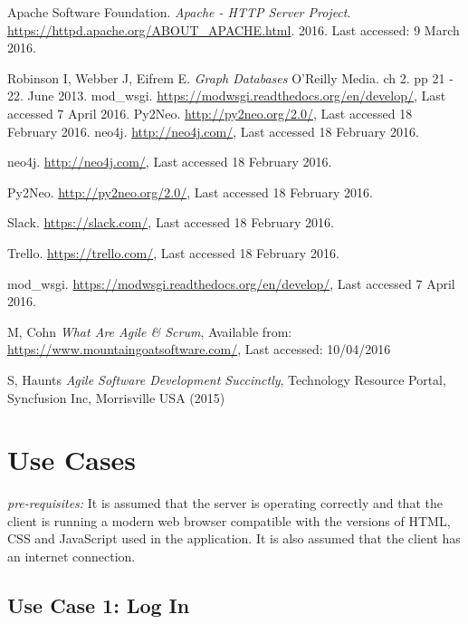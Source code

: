 \documentclass[12pt,onecolumn]{article}
\begin{document}
\begin{thebibliography}{1}
		 Apache Software Foundation. \emph{Apache - HTTP Server Project}. \url{https://httpd.apache.org/ABOUT_APACHE.html}. 2016. Last accessed: 9 March 2016.	
		
		 Robinson I, Webber J, Eifrem E. \emph{Graph Databases} O'Reilly Media. ch 2. pp 21 - 22. June 2013.
		 mod\_wsgi. \url{https://modwsgi.readthedocs.org/en/develop/}, Last accessed 7 April 2016.
		 Py2Neo. \url{http://py2neo.org/2.0/}, Last accessed 18 February 2016.
		 neo4j. \url{http://neo4j.com/}, Last accessed 18 February 2016.
		
		 neo4j. \url{http://neo4j.com/}, Last accessed 18 February 2016.
		
		 Py2Neo. \url{http://py2neo.org/2.0/}, Last accessed 18 February 2016.
		
		 Slack. \url{https://slack.com/}, Last accessed 18 February 2016.
		
		 Trello. \url{https://trello.com/}, Last accessed 18 February 2016.
		
		 mod\_wsgi. \url{https://modwsgi.readthedocs.org/en/develop/}, Last accessed 7 April 2016.
		
		
		 M, Cohn \emph{What Are Agile \& Scrum}, Available from: \url{https://www.mountaingoatsoftware.com/}, Last accessed: 10/04/2016
		
		 S, Haunts \emph{Agile Software Development Succinctly}, Technology Resource Portal, Syncfusion Inc, Morrisville USA (2015)
		
		
	\end{thebibliography}
	
	\newpage
	
	\appendix
	
	\section{Use Cases} \label{moreusecase}
	
	\emph{pre-requisites:} It is assumed that the server is operating correctly and that the client is running a modern web browser compatible with the versions of HTML, CSS and JavaScript used in the application. It is also assumed that the client has an internet connection.
	
	\subsection{Use Case 1: Log In}
\end{document}
